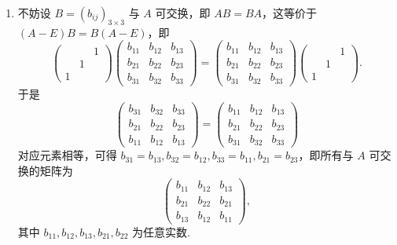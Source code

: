 \documentclass[UTF8,12pt,a4paper,fontset=fandol]{ctexart}
\begin{document}
\begin{solve}
\begin{enumerate}
                \item 不妨设 $ B = (b_{ij})_{3 \times 3} $ 与 $ A $ 可交换，即 $ AB = BA $，这等价于 $ (A - E)B = B(A - E) $，即
                      \[ \begin{pmatrix}
                                &   & 1 \\
                                & 1 &   \\
                              1 &   &
                          \end{pmatrix}
                          \begin{pmatrix}
                              b_{11} & b_{12} & b_{13} \\
                              b_{21} & b_{22} & b_{23} \\
                              b_{31} & b_{32} & b_{33}
                          \end{pmatrix} =
                          \begin{pmatrix}
                              b_{11} & b_{12} & b_{13} \\
                              b_{21} & b_{22} & b_{23} \\
                              b_{31} & b_{32} & b_{33}
                          \end{pmatrix}
                          \begin{pmatrix}
                                &   & 1 \\
                                & 1 &   \\
                              1 &   &
                          \end{pmatrix}. \]
                      于是
                      \[ \begin{pmatrix}
                              b_{31} & b_{32} & b_{33} \\
                              b_{21} & b_{22} & b_{23} \\
                              b_{11} & b_{12} & b_{13}
                          \end{pmatrix} = \begin{pmatrix}
                              b_{11} & b_{12} & b_{13} \\
                              b_{21} & b_{22} & b_{23} \\
                              b_{31} & b_{32} & b_{33}
                          \end{pmatrix} \]
                      对应元素相等，可得 $ b_{31} = b_{13}, b_{32} = b_{12}, b_{33} = b_{11}, b_{21} = b_{23} $，即所有与 $ A $ 可交换的矩阵为
                      \[ \begin{pmatrix}
                              b_{11} & b_{12} & b_{13} \\
                              b_{21} & b_{22} & b_{21} \\
                              b_{13} & b_{12} & b_{11}
                          \end{pmatrix}, \]
                      其中 $ b_{11}, b_{12}, b_{13}, b_{21}, b_{22} $ 为任意实数.


\end{enumerate}
\end{solve}
\end{document}
